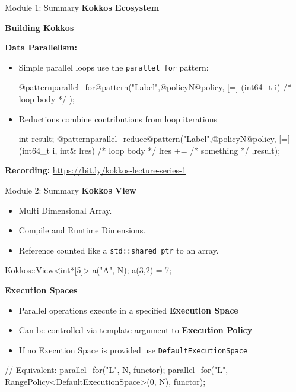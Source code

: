 \begin{frame}[fragile]{Module 1: Summary}
	\textbf{Kokkos Ecosystem}

	\textbf{Building Kokkos}

	\textbf{Data Parallelism:}

	\begin{itemize}
		\item Simple parallel loops use the \texttt{parallel\_for} pattern:
\begin{code}[linebackgroundcolor={\btLstHL<1->{3}{bodyColor}},frame=single]
@patternparallel_for@pattern("Label",@policyN@policy, [=] (int64_t i) {
  /* loop body */
});
\end{code}
\item Reductions combine contributions from loop iterations
\begin{code}[linebackgroundcolor={\btLstHL<1->{3}{bodyColor}},frame=single]
int result;
@patternparallel_reduce@pattern("Label",@policyN@policy, [=] (int64_t i, int& lres) {
   /* loop body */
    lres += /* something */
  },result);
\end{code}

\end{itemize}

	\textbf{Recording:} \url{https://bit.ly/kokkos-lecture-series-1}

\end{frame}



\begin{frame}[fragile]{Module 2: Summary}
	\textbf{Kokkos View}
	\begin{itemize}
		\item Multi Dimensional Array.
		\item Compile and Runtime Dimensions.
		\item Reference counted like a \texttt{std::shared\_ptr} to an array.
	\end{itemize}
\begin{code}[keywords={View,int}]
	Kokkos::View<int*[5]> a("A", N);
	a(3,2) = 7;
\end{code}

	\textbf{Execution Spaces}
	\begin{itemize}
		\item{Parallel operations execute in a specified \textbf{Execution Space}}
		\item{Can be controlled via template argument to \textbf{Execution Policy}}
		\item{If no Execution Space is provided use \texttt{DefaultExecutionSpace}}
	\end{itemize}
\begin{code}[keywords={parallel_for,Cuda,RangePolicy}]
// Equivalent:
parallel_for("L", N, functor);
parallel_for("L",
  RangePolicy<DefaultExecutionSpace>(0, N), functor);
\end{code}
\end{frame}

